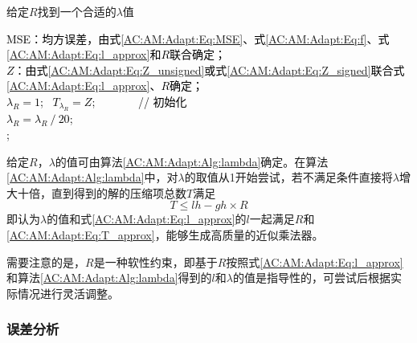 \begin{algorithm}[!]
    \caption{给定$R$找到一个合适的$\lambda$值}
    \label{AC:AM:Adapt:Alg:lambda}
    \BlankLine
    \textcolor{black}{
      MSE：均方误差，由式\eqref{AC:AM:Adapt:Eq:MSE}、式\eqref{AC:AM:Adapt:Eq:f}、式\eqref{AC:AM:Adapt:Eq:l_approx}和$R$联合确定； \\
      $Z$：由式\eqref{AC:AM:Adapt:Eq:Z_unsigned}或式\eqref{AC:AM:Adapt:Eq:Z_signed}联合式\eqref{AC:AM:Adapt:Eq:l_approx}、$R$确定； \\
      $\lambda_R = 1$; \  $T_{\lambda_R} = Z$; \ \ \ \ \ \ \ // 初始化 \\
      \BlankLine
      $\lambda_R = \lambda_R \ / \ 20$; \\
      ;}
  \end{algorithm}

给定$R$，$\lambda$的值可由算法\ref{AC:AM:Adapt:Alg:lambda}确定。在算法\ref{AC:AM:Adapt:Alg:lambda}中，对$\lambda$的取值从1开始尝试，若不满足条件直接将$\lambda$增大十倍，直到得到的解的压缩项总数$T$满足
\begin{equation}
    T \le lh -gh \times R 
\end{equation}
即认为$\lambda$的值和式\eqref{AC:AM:Adapt:Eq:l_approx}的$l$一起满足$R$和\eqref{AC:AM:Adapt:Eq:T_approx}，能够生成高质量的近似乘法器。

需要注意的是，$R$是一种软性约束，即基于$R$按照式\eqref{AC:AM:Adapt:Eq:l_approx}和算法\ref{AC:AM:Adapt:Alg:lambda}得到的$l$和$\lambda$的值是指导性的，可尝试后根据实际情况进行灵活调整。

\subsubsection{误差分析} \label{误差分析}

